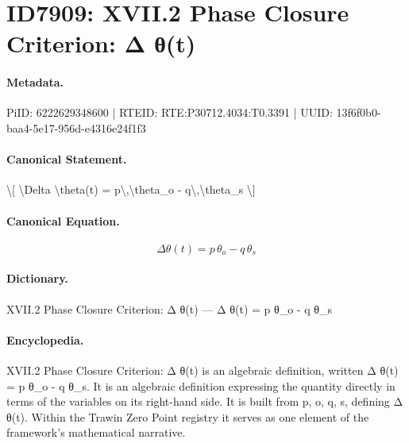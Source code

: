 \section*{ID7909: XVII.2 Phase Closure Criterion: Δ θ(t)}
\paragraph{Metadata.}
PiID: 6222629348600 | RTEID: RTE:P30712.4034:T0.3391 | UUID: 13f6f0b0-baa4-5e17-956d-e4316e24f1f3

\paragraph{Canonical Statement.}
\textbackslash{}[ \textbackslash{}Delta \textbackslash{}theta(t) = p\textbackslash{},\textbackslash{}theta\_o - q\textbackslash{},\textbackslash{}theta\_s \textbackslash{}]

\paragraph{Canonical Equation.}
\[
\Delta \theta(t) = p\,\theta_o - q\,\theta_s
\]

\paragraph{Dictionary.}
XVII.2 Phase Closure Criterion: Δ θ(t) — Δ θ(t) = p θ\_o - q θ\_s

\paragraph{Encyclopedia.}
XVII.2 Phase Closure Criterion: Δ θ(t) is an algebraic definition, written Δ θ(t) = p θ\_o - q θ\_s. It is an algebraic definition expressing the quantity directly in terms of the variables on its right-hand side. It is built from p, o, q, s, defining Δ θ(t). Within the Trawin Zero Point registry it serves as one element of the framework's mathematical narrative.
